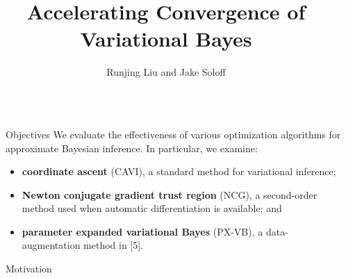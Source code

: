 \documentclass[final]{beamer}
\title{Accelerating Convergence of Variational Bayes} %
\author{Runjing Liu and Jake Soloff} %
\institute{Department of Statistics, UC Berkeley} %
\newlength{\sepwid}
\newlength{\onecolwid}
\begin{document}

\setlength{\belowcaptionskip}{2ex} %
\setlength\belowdisplayshortskip{2ex} %

\begin{frame}[t] %

\begin{columns}[t] %

\begin{column}{\sepwid}\end{column} %

\begin{column}{\onecolwid} %


\begin{alertblock}{Objectives}
We evaluate the effectiveness of various optimization algorithms for approximate Bayesian inference. In particular, we examine: \vspace{-.5em}
\begin{itemize}
\item {\bf coordinate ascent} (CAVI), a standard method for variational inference;
\item {\bf Newton conjugate gradient trust region} (NCG), a second-order method used when automatic differentiation is available; and
\item {\bf parameter expanded variational Bayes} (PX-VB), a data-augmentation method in [5]. 
\end{itemize}


\end{alertblock}


\begin{block}{Motivation}


\end{block}
\end{column}
\end{columns}
\end{frame}
\end{document}
